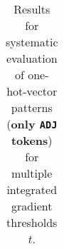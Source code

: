 \begin{table}[t]
\begin{tabular}{lllllll}

\hline
\end{tabular}
\caption[Model Evaluation for only \texttt{ADJ} tokens]{Results for systematic evaluation of one-hot-vector patterns (\textbf{only \texttt{ADJ} tokens}) for multiple integrated gradient thresholds $t$.}
\label{tab:evalResultsADJ}
\end{table}
	